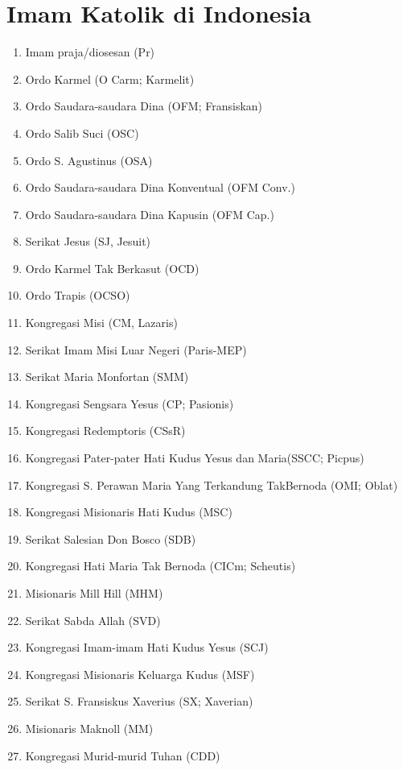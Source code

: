 \section*{Imam Katolik di Indonesia}

\begin{enumerate}
\item Imam praja/diosesan (Pr)
\item Ordo Karmel (O Carm; Karmelit)
\item Ordo Saudara-saudara Dina (OFM; Fransiskan)
\item Ordo Salib Suci (OSC)
\item Ordo S. Agustinus (OSA)
\item Ordo Saudara-saudara Dina Konventual (OFM Conv.)
\item Ordo Saudara-saudara Dina Kapusin (OFM Cap.)
\item Serikat Jesus (SJ, Jesuit)
\item Ordo Karmel Tak Berkasut (OCD)
\item Ordo Trapis (OCSO)
\item Kongregasi Misi (CM, Lazaris)
\item Serikat Imam Misi Luar Negeri (Paris-MEP)
\item Serikat Maria Monfortan (SMM)
\item Kongregasi Sengsara Yesus (CP; Pasionis)
\item Kongregasi Redemptoris (CSsR)
\item Kongregasi Pater-pater Hati Kudus Yesus dan Maria(SSCC; Picpus)
\item Kongregasi S.  Perawan  Maria Yang Terkandung TakBernoda (OMI; Oblat)                      
\item Kongregasi Misionaris Hati Kudus (MSC)
\item Serikat Salesian Don Bosco (SDB)
\item Kongregasi Hati Maria Tak Bernoda (CICm; Scheutis)
\item Misionaris Mill Hill (MHM)
\item Serikat Sabda Allah (SVD)
\item Kongregasi Imam-imam Hati Kudus Yesus (SCJ)
\item Kongregasi Misionaris Keluarga Kudus (MSF)
\item Serikat S. Fransiskus Xaverius (SX; Xaverian)
\item Misionaris Maknoll (MM)
\item Kongregasi Murid-murid Tuhan (CDD)
\end{enumerate}
